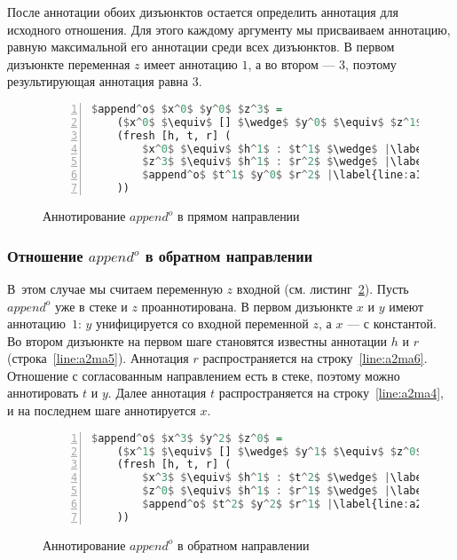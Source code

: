 \documentclass[conference,american,russian]{IEEEtran}
\begin{document}
После аннотации обоих дизъюнктов остается определить аннотация для исходного отношения. 
Для этого каждому аргументу мы присваиваем аннотацию, равную максимальной его аннотации среди всех дизъюнктов.
В первом дизъюнкте переменная $z$ имеет аннотацию $1$, а во втором --- $3$, поэтому результирующая аннотация равна $3$.

\begin{figure}[h!]
  \begin{center}
  \begin{minipage}{0.31\textwidth}
  \begin{lstlisting}[language=Haskell, frame=single, numbers=left,numberstyle=\small, escapechar=|]
  $append^o$ $x^0$ $y^0$ $z^3$ =
    ($x^0$ $\equiv$ [] $\wedge$ $y^0$ $\equiv$ $z^1$) $\vee$ |\label{line:a1ma2}|
    (fresh [h, t, r] (
        $x^0$ $\equiv$ $h^1$ : $t^1$ $\wedge$ |\label{line:a1ma4}|
        $z^3$ $\equiv$ $h^1$ : $r^2$ $\wedge$ |\label{line:a1ma5}|
        $append^o$ $t^1$ $y^0$ $r^2$ |\label{line:a1ma6}|
    ))
    \end{lstlisting}
  \end{minipage}
  \end{center}
  \caption{Аннотирование $append^o$ в прямом направлении}
  \label{lst:appendoANN1}
\end{figure}

\subsubsection{Отношение $append^o$ в обратном направлении}

В~этом случае мы считаем переменную $z$ входной (см. листинг~\ref{lst:appendoANN2}).
Пусть $append^o$ уже в стеке и $z$ проаннотирована.
В первом дизъюнкте $x$ и $y$ имеют аннотацию~$1$: $y$ унифицируется со входной переменной $z$, а $x$ --- с константой.
Во втором дизъюнкте на первом шаге становятся известны аннотации $h$ и $r$ (строка~\ref{line:a2ma5}).
Аннотация $r$ распространяется на строку~\ref{line:a2ma6}. 
Отношение с согласованным направлением есть в стеке, поэтому можно аннотировать $t$ и $y$.
Далее аннотация $t$ распространяется на строку~\ref{line:a2ma4}, и на последнем шаге аннотируется $x$. 

\begin{figure}[h!]
  \begin{center}
  \begin{minipage}{0.3\textwidth}
  \begin{lstlisting}[language=Haskell, frame=single, numbers=left,numberstyle=\small, escapechar=|]
  $append^o$ $x^3$ $y^2$ $z^0$ =
    ($x^1$ $\equiv$ [] $\wedge$ $y^1$ $\equiv$ $z^0$) $\vee$ |\label{line:a2ma2}|
    (fresh [h, t, r] (
        $x^3$ $\equiv$ $h^1$ : $t^2$ $\wedge$ |\label{line:a2ma4}|
        $z^0$ $\equiv$ $h^1$ : $r^1$ $\wedge$ |\label{line:a2ma5}|
        $append^o$ $t^2$ $y^2$ $r^1$ |\label{line:a2ma6}|
    ))
    \end{lstlisting}
  \end{minipage}
  \end{center}
  \caption{Аннотирование $append^o$ в обратном направлении}
  \label{lst:appendoANN2}
\end{figure}
\end{document}
